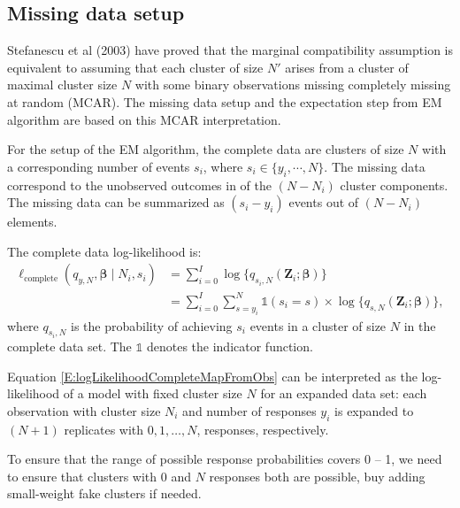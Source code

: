 \documentclass[reqno]{amsart}
\begin{document}
\subsection{Missing data setup}
Stefanescu et al (2003) have proved that the marginal compatibility assumption is equivalent to assuming that each cluster of size $N'$ arises from a cluster of maximal cluster size $N$ with some binary observations missing completely missing at random (MCAR). The missing data setup and the expectation step from EM algorithm are based on this MCAR interpretation. 

For the setup of the EM algorithm, the complete data are clusters of size $N$ with a corresponding number of events $s_i$, where $s_i \in \{y_i, \cdots, N \}$. The missing data correspond to the unobserved outcomes in of the $(N - N_i)$ cluster components. The missing data can be summarized as $(s_i - y_i)$ events out of $(N - N_i)$ elements.

The complete data log-likelihood is:
\begin{equation}\label{E:logLikelihoodCompleteMapFromObs}
\begin{split}
    \ell_{\text{complete}} (q_{y,N}, \boldsymbol{\beta} \mid N_i,s_i) &= \sum_{i=0}^I \log \{ q_{s_i,N}(\boldsymbol{Z}_i; \boldsymbol{\beta}) \} \\
    &= \sum_{i=0}^I \sum_{s=y_i}^N {\mathds{1}}(s_i=s) \times \log \{ q_{s,N}(\boldsymbol{Z}_i; \boldsymbol{\beta}) \}, 
\end{split}
\end{equation}
where $q_{s_i,N}$ is the probability of achieving $s_i$ events in a cluster of size $N$ in the complete data set. The $\mathds{1}$ denotes the indicator function.


Equation \ref{E:logLikelihoodCompleteMapFromObs} can be interpreted as the log-likelihood of a model with fixed cluster size $N$ for an expanded data set: each observation with cluster size $N_i$ and number of responses $y_i$ is expanded to $(N+1)$ replicates with $0, 1, \ldots, N$, responses, respectively.

To ensure that the range of possible response probabilities covers 0 -- 1, we need to ensure that clusters with 0 and $N$ responses both are possible, buy adding small-weight fake clusters if needed.
\end{document}
